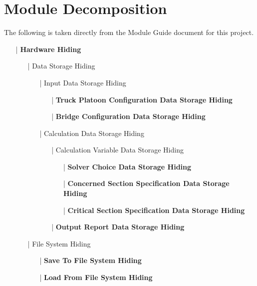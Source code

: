 \documentclass[12pt, titlepage]{article}
\begin{document}
\section{Module Decomposition}

The following is taken directly from the Module Guide document for this project.

\begin{enumerate}
    \item[|] \textbf{Hardware Hiding}
    \begin{enumerate}
        \item[|] Data Storage Hiding
        \begin{enumerate}
            \item[|] Input Data Storage Hiding
            \begin{enumerate}
                \item[|] \textbf{Truck Platoon Configuration Data Storage Hiding}
                \item[|] \textbf{Bridge Configuration Data Storage Hiding}
            \end{enumerate}
            \item[|] Calculation Data Storage Hiding
            \begin{enumerate}
                \item[|] Calculation Variable Data Storage Hiding
                \begin{itemize}
                    \item[|] \textbf{Solver Choice Data Storage Hiding}
                    \item[|] \textbf{Concerned Section Specification Data Storage Hiding}
                    \item[|] \textbf{Critical Section Specification Data Storage Hiding}
                \end{itemize}
                \item[|] \textbf{Output Report Data Storage Hiding}
            \end{enumerate}
        \end{enumerate}
        \item[|] File System Hiding
        \begin{enumerate}
            \item[|] \textbf{Save To File System Hiding}
            \item[|] \textbf{Load From File System Hiding} 
        \end{enumerate}
    \end{enumerate}

\end{enumerate}
\end{document}
